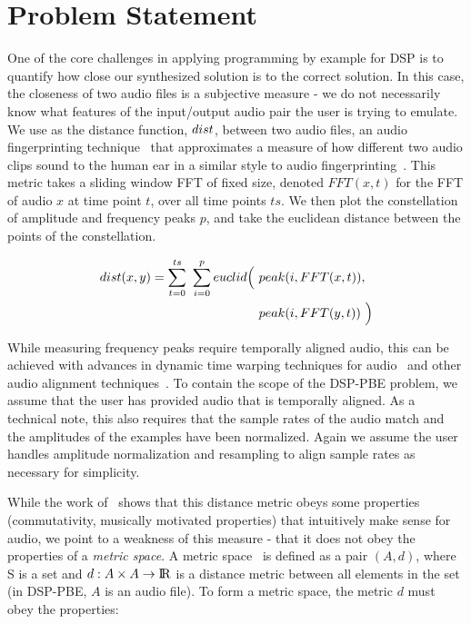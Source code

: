 
\section{Problem Statement}

One of the core challenges in applying programming by example for DSP is to quantify how close our synthesized solution is to the correct solution.
In this case, the closeness of two audio files is a subjective measure - we do not necessarily know what features of the input/output audio pair the user is trying to emulate.
We use as the distance function, $dist$, between two audio files, an audio fingerprinting technique~\cite{SantolucitoFARM} that approximates a measure of how different two audio clips sound to the human ear in a similar style to audio fingerprinting~\cite{wang2003industrial,fingerprinting}.
This metric takes a sliding window FFT of fixed size, denoted $FFT(x,t)$ for the FFT of audio $x$ at time point $t$, over all time points $ts$.
We then plot the constellation of amplitude and frequency peaks $p$, and take the euclidean distance between the points of the constellation.

%
\begin{align*}
\distFxn(x,y) =  \sum_{t=0}^{ts}\ \sum_{i=0}^{p} euclid\Big(\ &peak(i,FFT(x,t)), \\ &peak(i,FFT(y,t))\ \Big)
\end{align*}
%

While measuring frequency peaks require temporally aligned audio, this can be achieved with advances in dynamic time warping techniques for audio~\cite{carabias2015audio} and other audio alignment techniques~\cite{ArztL18}.
To contain the scope of the DSP-PBE problem, we assume that the user has provided audio that is temporally aligned.
As a technical note, this also requires that the sample rates of the audio match and the amplitudes of the examples have been normalized.
Again we assume the user handles amplitude normalization and resampling to align sample rates as necessary for simplicity.

While the work of~\cite{SantolucitoFARM} shows that this distance metric obeys some properties (commutativity, musically motivated properties) that intuitively make sense for audio,
  we point to a weakness of this measure - that it does not obey the properties of a \textit{metric space}.
A metric space~\cite{frechet1906quelques} is defined as a pair $(A,d)$, where S is a set and $d:A \times A \to {\rm I\!R}$ is a distance metric between all elements in the set (in DSP-PBE, $A$ is an audio file).
To form a metric space, the metric $d$ must obey the properties:

